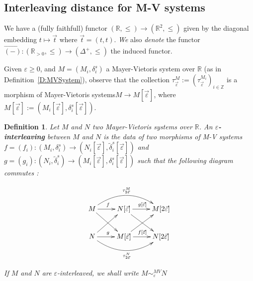 \documentclass[a4paper, english, 11pt]{article}
\newcommand{\0}{\vec{0}}
\newcommand{\R}[0]{\mathbb{R}}
\newcommand{\Z}[0]{\mathbb{Z}}
\newtheorem{defi}[prop]{Definition}
\begin{document}
\subsection{Interleaving distance for M-V systems}
We have a (fully faithfull) functor $(\R ,\leq) \to (\R^2, \leq)$ given by the diagonal embedding  $t\mapsto \vec{t}$ where $\vec{t}=(t,t)$. \emph{We} also \emph{denote}  the functor $\overrightarrow{(-)}: (\R_{>0} ,\leq) \to (\Delta^+, \leq)$  the induced functor. 

\smallskip

Given $\varepsilon \geq 0$, and $M = (M_i,\delta_i^s)$ a Mayer-Vietoris system over $\R$ (as in Definition~\ref{D:MVSystem}), observe that the collection $\tau_{\vec{\varepsilon}}^M:=(\tau_{\vec{\varepsilon}}^{M_i})_{i\in\Z}$ is a morphism of Mayer-Vietoris systems$M \longrightarrow M[\vec{\varepsilon}]$, where $M[\vec{\varepsilon}]:=(M_i[\vec{\varepsilon}],\delta_i^s[\vec{\varepsilon}])$.

\begin{defi}
Let $M$ and $N$ two Mayer-Vietoris systems over $\R$. An \textbf{$\varepsilon$-interleaving} between $M$ and $N$ is the data of two morphisms of M-V systems $f = (f_i) : (M_i,\delta_i^s) \longrightarrow (N_i[\vec{\varepsilon}],\tilde{\delta}_i^s [\vec{\varepsilon}])$ and $g = (g_i) : (N_i,\tilde{\delta}_i^s) \longrightarrow (M_i[\vec{\varepsilon}],\delta_i^s[\vec{\varepsilon}]) $ such that the following diagram commutes : 

\begin{equation}\label{eq:Interleaving} \xymatrix{
M  \ar[rd]\ar@/^0.7cm/[rr]^{\tau_{2\vec{\varepsilon}}^M} \ar[r]^{f} & N[\vec{\varepsilon}]  \ar[rd] \ar[r]^{g[\vec{\varepsilon}]} & M[2\vec{\varepsilon}] \\
N  \ar[ur]\ar@/_0.7cm/[rr]_{\tau_{2\vec{\varepsilon}}^N} \ar[r]^{g} & M[\vec{\varepsilon}]  \ar[ur] \ar[r]^{f[\vec{\varepsilon}]} & N[2\vec{\varepsilon}]
   } \end{equation}
   
If $M$ and $N$ are $\varepsilon$-interleaved, we shall write $M\sim_\varepsilon^{MV} N$

\end{defi}
\end{document}
